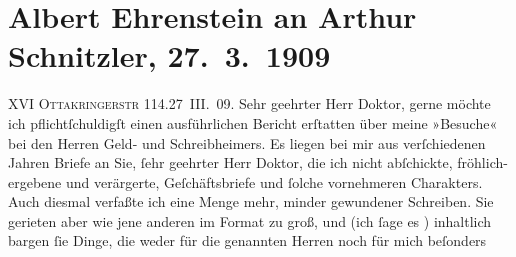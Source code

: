 

         
         \renewcommand{\erwaehntePersonen}{Personen: Raoul Auernheimer, Karl Glossy, Felix von Oppenheimer}
         \renewcommand{\erwaehnteOrte}{Orte: Ottakringerstraße, Wien}
         \renewcommand{\erwaehnteWerke}{}
               \section[Albert Ehrenstein an Arthur Schnitzler, 27. 3. 1909]{ Albert Ehrenstein an Arthur Schnitzler, 27. 3. 1909}\nopagebreak{}\rehead{ }\begin{ledgroupsized}[t]{13cm}\normalsize\beginnumbering \toendnotes[C]{\smallbreak\pagebreak[2]} 
\toendnotes[C]{\smallbreak}\pstart
           {\pb}XVI \textsc{Ottakringerstr}
                        114.\hfill 27 III. 09.\pend
           \pstart{}Sehr geehrter Herr Doktor,\pend\pstart
           gerne möchte ich pflichtſchuldigſt einen ausführlichen Bericht erſtatten über meine
               »Besuche« bei den Herren Geld-
                  und Schreibheimers. Es liegen bei mir aus verſchiedenen Jahren Briefe an Sie,
               ſehr geehrter Herr Doktor, die ich nicht abſchickte, fröhlich-ergebene und
               verärgerte, Geſchäftsbriefe und ſolche vornehmeren Charakters. Auch diesmal verfaßte
               ich eine Menge mehr, minder gewundener Schreiben. Sie gerieten aber wie jene anderen
               im Format zu groß, und (ich ſage es \label{K_L01835_1v}\label{K_L01835_1h}) {\pb}inhaltlich
               bargen ſie Dinge, die weder für die genannten Herren noch für mich beſonders

\end{ledgroupsized}
